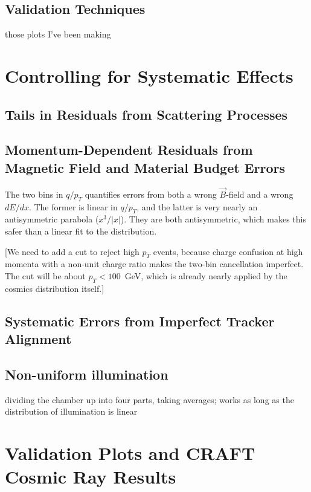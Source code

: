 \documentclass[12pt]{article}
\begin{document}
\subsection{Validation Techniques}

those plots I've been making

\section{Controlling for Systematic Effects}

\subsection{Tails in Residuals from Scattering Processes}
\label{sec:scattering_tails}

\subsection{Momentum-Dependent Residuals from Magnetic Field and Material Budget Errors}

The two bins in $q/p_T$ quantifies errors from both a wrong
$\vec{B}$-field and a wrong $dE/dx$.  The former is linear in $q/p_T$,
and the latter is very nearly an antisymmetric parabola ($x^3/|x|$).
They are both antisymmetric, which makes this safer than a linear fit
to the distribution.

[We need to add a cut to reject high $p_T$ events, because charge
  confusion at high momenta with a non-unit charge ratio makes the
  two-bin cancellation imperfect.  The cut will be about $p_T <
  100$~GeV, which is already nearly applied by the cosmics
  distribution itself.]

\subsection{Systematic Errors from Imperfect Tracker Alignment}

\subsection{Non-uniform illumination}

dividing the chamber up into four parts, taking averages; works as
long as the distribution of illumination is linear

\section{Validation Plots and CRAFT Cosmic Ray Results}
\end{document}

